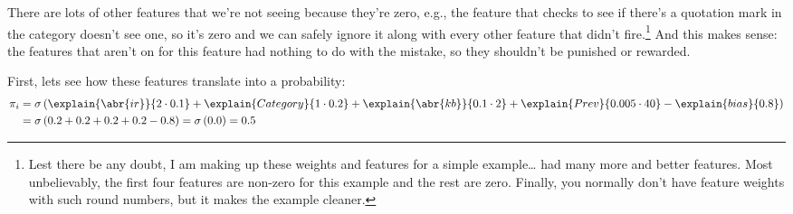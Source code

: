 There are lots of other features that we're not seeing
because they're zero, e.g., the feature that checks to see if there's
a quotation mark in the category doesn't see one, so it's zero and we
can safely ignore it along with every other feature that didn't fire.\footnote{Lest there be any doubt, I am
  making up these weights and features for a simple example\dots \watson{} had
  many more and better features.  Most unbelievably, the first four features
  are non-zero for this example and the rest are zero.  Finally, you normally
  don't have feature weights with such round numbers, but it makes the example
  cleaner.}
%
And this makes sense: the features that aren't on for this feature had
nothing to do with the mistake, so they shouldn't be punished or
rewarded.

\newcommand{\watsonvspace}{\vspace{.06cm}}

First, lets see how these features translate into a probability:
\begin{align}
  \pi_i & = \sigma \left(\explain{\abr{ir}}{2 \cdot 0.1} + \explain{Category}{1\cdot 0.2}+\explain{\abr{kb}}{0.1\cdot 2}+ \explain{Prev}{0.005 \cdot 40} - \explain{bias}{0.8}
          \right) \\
  & =
  \sigma \left( 0.2 + 0.2 + 0.2 + 0.2 - 0.8 \right) = \sigma \left( 0.0 \right) = 0.5
\end{align}

